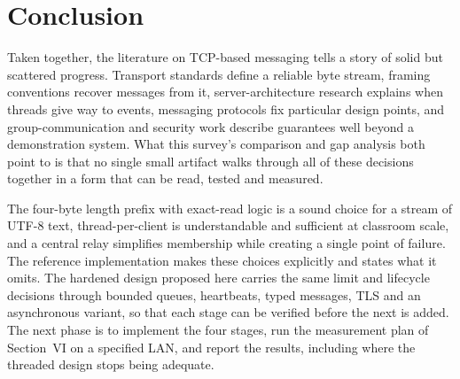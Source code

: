 \documentclass[conference]{IEEEtran}
\begin{document}
\section{Conclusion}
Taken together, the literature on TCP-based messaging tells a story of solid but scattered progress. Transport standards define a reliable byte stream, framing conventions recover messages from it, server-architecture research explains when threads give way to events, messaging protocols fix particular design points, and group-communication and security work describe guarantees well beyond a demonstration system. What this survey's comparison and gap analysis both point to is that no single small artifact walks through all of these decisions together in a form that can be read, tested and measured.

The four-byte length prefix with exact-read logic is a sound choice for a stream of UTF-8 text, thread-per-client is understandable and sufficient at classroom scale, and a central relay simplifies membership while creating a single point of failure. The reference implementation makes these choices explicitly and states what it omits. The hardened design proposed here carries the same limit and lifecycle decisions through bounded queues, heartbeats, typed messages, TLS and an asynchronous variant, so that each stage can be verified before the next is added. The next phase is to implement the four stages, run the measurement plan of Section~VI on a specified LAN, and report the results, including where the threaded design stops being adequate.
\end{document}
